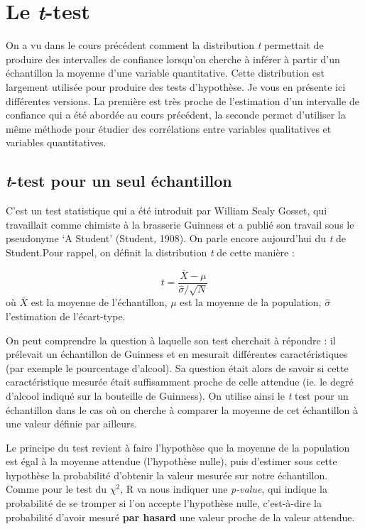 \documentclass[
]{book}
\begin{document}
\hypertarget{le-t-test}{%
\section{\texorpdfstring{Le \emph{t}-test}{Le t-test}}\label{le-t-test}}

On a vu dans le cours précédent comment la distribution \emph{t} permettait de produire des intervalles de confiance lorsqu'on cherche à inférer à partir d'un échantillon la moyenne d'une variable quantitative. Cette distribution est largement utilisée pour produire des tests d'hypothèse. Je vous en présente ici différentes versions. La première est très proche de l'estimation d'un intervalle de confiance qui a été abordée au cours précédent, la seconde permet d'utiliser la même méthode pour étudier des corrélations entre variables qualitatives et variables quantitatives.

\hypertarget{t-test-pour-un-seul-uxe9chantillon}{%
\subsection{\texorpdfstring{\emph{t}-test pour un seul échantillon}{t-test pour un seul échantillon}}\label{t-test-pour-un-seul-uxe9chantillon}}

C'est un test statistique qui a été introduit par William Sealy Gosset,
qui travaillait comme chimiste à la brasserie Guinness et a publié son
travail sous le pseudonyme `A Student' (Student, 1908). On parle encore
aujourd'hui du \emph{t} de Student.Pour rappel, on définit la distribution \emph{t} de cette manière :

\[ t = \frac{\bar{X} - \mu}{\hat{\sigma}/\sqrt{N}}\] où \(\bar{X}\) est la
moyenne de l'échantillon, \(\mu\) est la moyenne de la population,
\(\hat{\sigma}\) l'estimation de l'écart-type.

On peut comprendre la question à laquelle son test cherchait à répondre : il prélevait un échantillon de Guinness et en mesurait différentes caractéristiques (par exemple le pourcentage d'alcool). Sa question était alors de savoir si cette caractéristique mesurée était suffisamment proche de celle attendue (ie. le degré d'alcool indiqué sur la bouteille de Guinness). On utilise ainsi le \emph{t} test pour un échantillon dans le cas où on cherche à comparer la moyenne de cet échantillon à une valeur définie par ailleurs.

Le principe du test revient à faire l'hypothèse que la moyenne de la population est égal à la moyenne attendue (l'hypothèse nulle), puis d'estimer sous cette hypothèse la probabilité d'obtenir la valeur mesurée sur notre échantillon. Comme pour le test du \(\chi^2\), R va nous indiquer une \emph{p-value}, qui indique la probabilité de se tromper si l'on accepte l'hypothèse nulle, c'est-à-dire la probabilité d'avoir mesuré \textbf{par hasard} une valeur proche de la valeur attendue.
\end{document}

